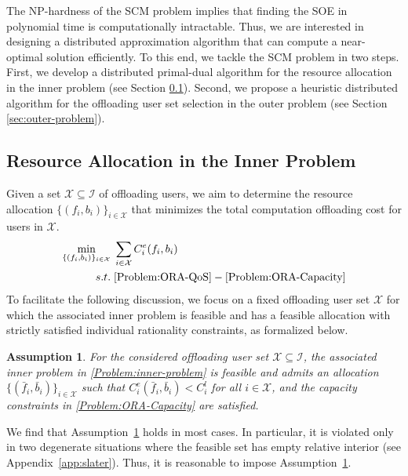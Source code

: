 \documentclass[lettersize,journal]{IEEEtran}
\newtheorem{assumption}{Assumption}
\begin{document}
The NP-hardness of the SCM problem implies that finding the SOE in polynomial time is computationally intractable. 
Thus, we are interested in designing a distributed approximation algorithm that can compute a near-optimal solution efficiently.
To this end, we tackle the SCM problem in two steps. First, we develop a distributed primal-dual algorithm for the resource allocation in the inner problem (see Section \ref{sec:inner-problem}). Second, we propose a heuristic distributed algorithm for the offloading user set selection in the outer problem (see Section \ref{sec:outer-problem}).

\subsection{Resource Allocation in the Inner Problem}\label{sec:inner-problem}
Given a set $\mathcal{X}\subseteq\mathcal{I}$ of offloading users, we aim to determine the resource allocation $\{(f_i,b_i)\}_{i\in\mathcal{X}}$ that minimizes the total computation offloading cost for users in $\mathcal{X}$.
\begin{align}\label{Problem:inner-problem}
    \min_{\{(f_i,b_i)\}_{i\in\mathcal{X}}}&\;\sum_{i\in\mathcal{X}}C^e_i(f_i,b_i)\\
    s.t.&\;\eqref{Problem:ORA-QoS}-\eqref{Problem:ORA-Capacity}\nonumber
\end{align}
To facilitate the following discussion, we focus on a fixed offloading user set $\mathcal{X}$ for which the associated inner problem is feasible and has a feasible allocation with strictly satisfied individual rationality constraints, as formalized below.

\begin{assumption}\label{assump:feasibility-inner}
For the considered offloading user set $\mathcal{X}\subseteq\mathcal{I}$, the associated inner problem in \eqref{Problem:inner-problem} is feasible and admits an allocation $\{(\bar f_i,\bar b_i)\}_{i\in\mathcal{X}}$ such that
$C_i^e(\bar f_i,\bar b_i) < C_i^l$ for all $i\in\mathcal{X}$,
and the capacity constraints in \eqref{Problem:ORA-Capacity} are satisfied.
\end{assumption}

We find that Assumption~\ref{assump:feasibility-inner} holds in most cases. In particular, it is violated only in two degenerate situations where the feasible set has empty relative interior (see Appendix~\ref{app:slater}). Thus, it is reasonable to impose Assumption~\ref{assump:feasibility-inner}.
\end{document}

